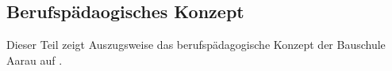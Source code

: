 \documentclass[
11pt,
captions=tableheading,
smallheadings,
headsepline,
footsepline, 
captions=tableheading,
parskip=half-,
]{scrartcl}
\begin{document}






\subsection{Berufspädaogisches Konzept}
Dieser Teil zeigt Auszugsweise das berufspädagogische Konzept der Bauschule Aarau auf \cite{BerufspädagogischesKonzept_BauschuleAarau}.
\end{document}
